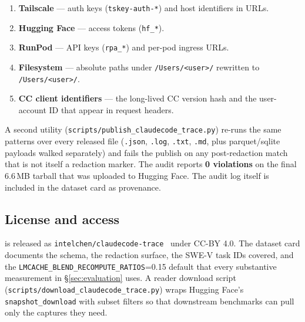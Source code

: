 \begin{enumerate}
\item \textbf{Tailscale} --- auth keys (\texttt{tskey-auth-*}) and host
  identifiers in URLs.
\item \textbf{Hugging Face} --- access tokens (\texttt{hf\_*}).
\item \textbf{RunPod} --- API keys (\texttt{rpa\_*}) and per-pod ingress
  URLs.
\item \textbf{Filesystem} --- absolute paths under \texttt{/Users/<user>/}
  rewritten to \texttt{/Users/<user>/}.
\item \textbf{CC client identifiers} --- the long-lived CC version
  hash and the user-account ID that appear in request headers.
\end{enumerate}

A second utility (\texttt{scripts/publish\_claudecode\_trace.py}) re-runs
the same patterns over every released file (\texttt{.json},
\texttt{.log}, \texttt{.txt}, \texttt{.md}, plus parquet/sqlite payloads
walked separately) and fails the publish on any post-redaction match
that is not itself a redaction marker. The audit reports
\textbf{0 violations} on the final 6.6\,MB tarball that was uploaded to
Hugging Face. The audit log itself is included in the dataset card as
provenance.

\subsection{License and access}
\label{sec:dataset-license}

\dataset{} is released as
\texttt{intelchen/claudecode-trace}~\cite{claudecode-trace-hf} under
CC-BY 4.0. The dataset card documents the schema, the redaction surface,
the SWE-V task IDs covered, and the
\texttt{LMCACHE\_BLEND\_RECOMPUTE\_RATIOS}=0.15 default that every
substantive measurement in \S\ref{sec:evaluation} uses. A reader
download script
(\texttt{scripts/download\_claudecode\_trace.py}) wraps Hugging Face's
\texttt{snapshot\_download} with subset filters so that downstream
benchmarks can pull only the captures they need.
